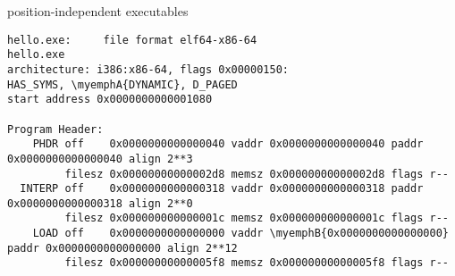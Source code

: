 \begin{frame}[fragile,label=pie-headers]{position-independent executables}
\begin{Verbatim}[commandchars=\\\{\},fontsize=\fontsize{9}{10}\selectfont]
hello.exe:     file format elf64-x86-64
hello.exe
architecture: i386:x86-64, flags 0x00000150:
HAS_SYMS, \myemphA{DYNAMIC}, D_PAGED
start address 0x0000000000001080

Program Header:
    PHDR off    0x0000000000000040 vaddr 0x0000000000000040 paddr 0x0000000000000040 align 2**3
         filesz 0x00000000000002d8 memsz 0x00000000000002d8 flags r--
  INTERP off    0x0000000000000318 vaddr 0x0000000000000318 paddr 0x0000000000000318 align 2**0
         filesz 0x000000000000001c memsz 0x000000000000001c flags r--
    LOAD off    0x0000000000000000 vaddr \myemphB{0x0000000000000000} paddr 0x0000000000000000 align 2**12
         filesz 0x00000000000005f8 memsz 0x00000000000005f8 flags r--
\end{Verbatim}
\end{frame}
